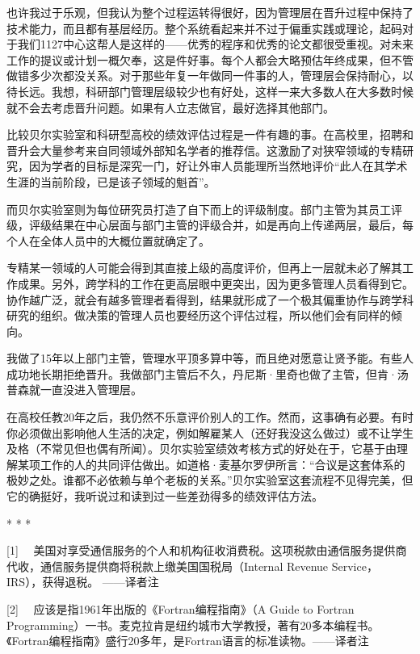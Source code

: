 \documentclass[a4paper,12pt,UTF8,twoside]{ctexbook}
\begin{document}
也许我过于乐观，但我认为整个过程运转得很好，因为管理层在晋升过程中保持了技术能力，而且都有基层经历。整个系统看起来并不过于偏重实践或理论，起码对于我们1127中心这帮人是这样的——优秀的程序和优秀的论文都很受重视。对未来工作的提议或计划一概欠奉，这是件好事。每个人都会大略预估年终成果，但不管做错多少次都没关系。对于那些年复一年做同一件事的人，管理层会保持耐心，以待长远。我想，科研部门管理层级较少也有好处，这样一来大多数人在大多数时候就不会去考虑晋升问题。如果有人立志做官，最好选择其他部门。

比较贝尔实验室和科研型高校的绩效评估过程是一件有趣的事。在高校里，招聘和晋升会大量参考来自同领域外部知名学者的推荐信。这激励了对狭窄领域的专精研究，因为学者的目标是深究一门，好让外审人员能理所当然地评价“此人在其学术生涯的当前阶段，已是该子领域的魁首”。

而贝尔实验室则为每位研究员打造了自下而上的评级制度。部门主管为其员工评级，评级结果在中心层面与部门主管的评级合并，如是再向上传递两层，最后，每个人在全体人员中的大概位置就确定了。

专精某一领域的人可能会得到其直接上级的高度评价，但再上一层就未必了解其工作成果。另外，跨学科的工作在更高层眼中更突出，因为更多管理人员看得到它。协作越广泛，就会有越多管理者看得到，结果就形成了一个极其偏重协作与跨学科研究的组织。做决策的管理人员也要经历这个评估过程，所以他们会有同样的倾向。

我做了15年以上部门主管，管理水平顶多算中等，而且绝对愿意让贤予能。有些人成功地长期拒绝晋升。我做部门主管后不久，丹尼斯·里奇也做了主管，但肯·汤普森就一直没进入管理层。

在高校任教20年之后，我仍然不乐意评价别人的工作。然而，这事确有必要。有时你必须做出影响他人生活的决定，例如解雇某人（还好我没这么做过）或不让学生及格（不常见但也偶有所闻）。贝尔实验室绩效考核方式的好处在于，它基于由理解某项工作的人的共同评估做出。如道格·麦基尔罗伊所言：“合议是这套体系的极妙之处。谁都不必依赖与单个老板的关系。”贝尔实验室这套流程不见得完美，但它的确挺好，我听说过和读到过一些差劲得多的绩效评估方法。



* * *



[1]　 美国对享受通信服务的个人和机构征收消费税。这项税款由通信服务提供商代收，通信服务提供商将税款上缴美国国税局（Internal Revenue Service，IRS），获得退税。 ——译者注

[2]　 应该是指1961年出版的《Fortran编程指南》（A Guide to Fortran Programming）一书。麦克拉肯是纽约城市大学教授，著有20多本编程书。《Fortran编程指南》盛行20多年，是Fortran语言的标准读物。——译者注
\end{document}

